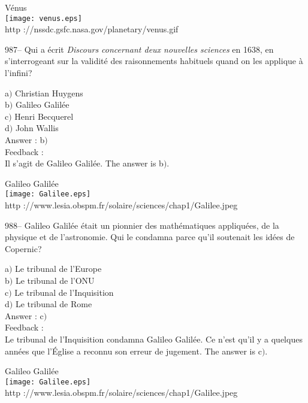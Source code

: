 \documentclass[letterpaper, 12pt]{article}
\begin{document}
        \begin{center}
        V\'enus\\
    \texttt{[image: venus.eps]}\\
        {\footnotesize http ://nssdc.gsfc.nasa.gov/planetary/venus.gif}
    \end{center}

987-- Qui a \'ecrit {\sl Discours concernant deux nouvelles
sciences} en 1638, en s'interrogeant sur la validit\'e des
raisonnements habituels quand on les applique \`a l'infini?

a$)$ Christian Huygens \\
b$)$ Galileo Galil\'ee \\
c$)$ Henri Becquerel \\
d$)$ John Wallis\\

Answer : b$)$\\

Feedback :\\
Il s'agit de Galileo Galil\'ee. The answer is b$)$.

        \begin{center}
        Galileo Galil\'ee\\
    \texttt{[image: Galilee.eps]}\\
        {\footnotesize http
://www.lesia.obspm.fr/solaire/sciences/chap1/Galilee.jpeg}
    \end{center}

988-- Galileo Galil\'ee \'etait un pionnier des math\'ematiques
appliqu\'ees, de la physique et de l'astronomie. Qui le condamna
parce qu'il soutenait les id\'ees de Copernic?

a$)$ Le tribunal de l'Europe \\
b$)$ Le tribunal de l'ONU \\
c$)$ Le tribunal de l'Inquisition \\
d$)$ Le tribunal de Rome\\

Answer : c$)$\\

Feedback : \\
Le tribunal de l'Inquisition condamna Galileo Galil\'ee. Ce n'est
qu'il y a quelques ann\'ees que l'\'Eglise a reconnu son erreur de
jugement.
The answer is c$)$.\\

        \begin{center}
        Galileo Galil\'ee\\
    \texttt{[image: Galilee.eps]}\\
        {\footnotesize http
://www.lesia.obspm.fr/solaire/sciences/chap1/Galilee.jpeg}
    \end{center}
\end{document}
